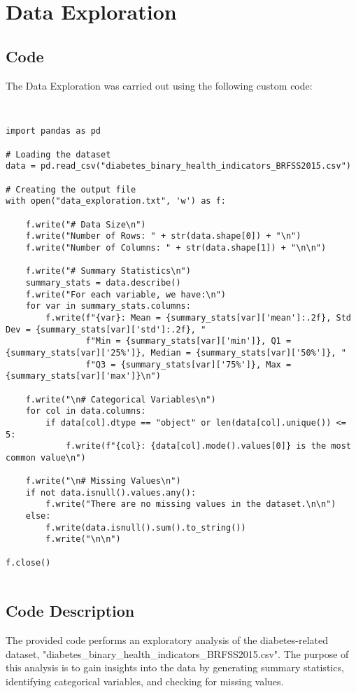 \documentclass[11pt]{article}
\begin{document}
\section{Data Exploration} \subsection{Code}The Data Exploration was carried out using the following custom code:

\begin{verbatim}


import pandas as pd

# Loading the dataset
data = pd.read_csv("diabetes_binary_health_indicators_BRFSS2015.csv")

# Creating the output file
with open("data_exploration.txt", 'w') as f:

    f.write("# Data Size\n")
    f.write("Number of Rows: " + str(data.shape[0]) + "\n")
    f.write("Number of Columns: " + str(data.shape[1]) + "\n\n")

    f.write("# Summary Statistics\n")
    summary_stats = data.describe()
    f.write("For each variable, we have:\n")
    for var in summary_stats.columns:
        f.write(f"{var}: Mean = {summary_stats[var]['mean']:.2f}, Std Dev = {summary_stats[var]['std']:.2f}, "
                f"Min = {summary_stats[var]['min']}, Q1 = {summary_stats[var]['25%']}, Median = {summary_stats[var]['50%']}, "
                f"Q3 = {summary_stats[var]['75%']}, Max = {summary_stats[var]['max']}\n")

    f.write("\n# Categorical Variables\n")
    for col in data.columns:
        if data[col].dtype == "object" or len(data[col].unique()) <= 5:
            f.write(f"{col}: {data[col].mode().values[0]} is the most common value\n")

    f.write("\n# Missing Values\n")
    if not data.isnull().values.any():
        f.write("There are no missing values in the dataset.\n\n")
    else:
        f.write(data.isnull().sum().to_string())
        f.write("\n\n")

f.close()


\end{verbatim}

\subsection{Code Description}

The provided code performs an exploratory analysis of the diabetes-related dataset, "diabetes\_binary\_health\_indicators\_BRFSS2015.csv". The purpose of this analysis is to gain insights into the data by generating summary statistics, identifying categorical variables, and checking for missing values.
\end{document}
